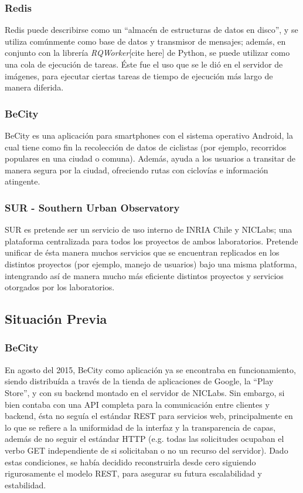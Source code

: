 \documentclass[11pt,letterpaper]{article}
\begin{document}
\subsubsection{Redis}

Redis puede describirse como un ``almacén de estructuras de datos en disco'', y se utiliza comúnmente como base de datos y transmisor de mensajes; además, en conjunto con la librería \emph{RQWorker}[cite here] de Python, se puede utilizar como una cola de ejecución de tareas. Éste fue el uso que se le dió en el servidor de imágenes, para ejecutar ciertas tareas de tiempo de ejecución más largo de manera diferida.

\subsubsection{BeCity}

BeCity es una aplicación para smartphones con el sistema operativo Android, la cual tiene como fin la recolección de datos de ciclistas (por ejemplo, recorridos populares en una ciudad o comuna). Además, ayuda a los usuarios a transitar de manera segura por la ciudad, ofreciendo rutas con ciclovías e información atingente.

\subsubsection{SUR - Southern Urban Observatory}

SUR es pretende ser un servicio de uso interno de INRIA Chile y NICLabs; una plataforma centralizada para todos los proyectos de ambos laboratorios. Pretende unificar de ésta manera muchos servicios que se encuentran replicados en los distintos proyectos (por ejemplo, manejo de usuarios) bajo una misma platforma, intengrando así de manera mucho más eficiente distintos proyectos y servicios otorgados por los laboratorios.

\subsection{Situación Previa}
\subsubsection{BeCity}

En agosto del 2015, BeCity como aplicación ya se encontraba en funcionamiento, siendo distribuída a través de la tienda de aplicaciones de Google, la ``Play Store'', y con su backend montado en el servidor de NICLabs. Sin embargo, si bien contaba con una API completa para la comunicación entre clientes y backend, ésta no seguía el estándar REST para servicios web, principalmente en lo que se refiere a la uniformidad de la interfaz y la transparencia de capas, además de no seguir el estándar HTTP (e.g. todas las solicitudes ocupaban el verbo GET independiente de si solicitaban o no un recurso del servidor). Dado estas condiciones, se había decidido reconstruirla desde cero siguiendo rigurosamente el modelo REST, para asegurar su futura escalabilidad y estabilidad.
\end{document}
